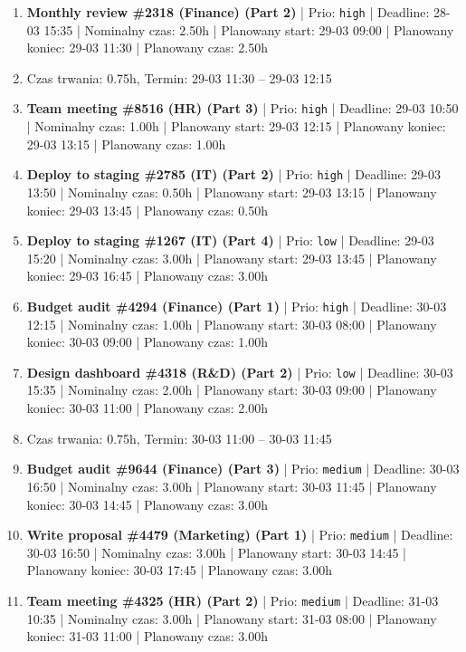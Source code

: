 {\begin{enumerate}
  \item [\textbf{14618}] \textbf{Monthly review \#2318 (Finance) (Part 2)} | Prio: \texttt{high} | Deadline: 28-03 15:35 | Nominalny czas: 2.50h | Planowany start: 29-03 09:00 | Planowany koniec: 29-03 11:30 | Planowany czas: 2.50h
  \item [\textbf{PRZERWA}] Czas trwania: 0.75h, Termin: 29-03 11:30 -- 29-03 12:15
  \item [\textbf{14624}] \textbf{Team meeting \#8516 (HR) (Part 3)} | Prio: \texttt{high} | Deadline: 29-03 10:50 | Nominalny czas: 1.00h | Planowany start: 29-03 12:15 | Planowany koniec: 29-03 13:15 | Planowany czas: 1.00h
  \item [\textbf{14623}] \textbf{Deploy to staging \#2785 (IT) (Part 2)} | Prio: \texttt{high} | Deadline: 29-03 13:50 | Nominalny czas: 0.50h | Planowany start: 29-03 13:15 | Planowany koniec: 29-03 13:45 | Planowany czas: 0.50h
  \item [\textbf{14686}] \textbf{Deploy to staging \#1267 (IT) (Part 4)} | Prio: \texttt{low} | Deadline: 29-03 15:20 | Nominalny czas: 3.00h | Planowany start: 29-03 13:45 | Planowany koniec: 29-03 16:45 | Planowany czas: 3.00h
  \item [\textbf{14619}] \textbf{Budget audit \#4294 (Finance) (Part 1)} | Prio: \texttt{high} | Deadline: 30-03 12:15 | Nominalny czas: 1.00h | Planowany start: 30-03 08:00 | Planowany koniec: 30-03 09:00 | Planowany czas: 1.00h
  \item [\textbf{14691}] \textbf{Design dashboard \#4318 (R\&D) (Part 2)} | Prio: \texttt{low} | Deadline: 30-03 15:35 | Nominalny czas: 2.00h | Planowany start: 30-03 09:00 | Planowany koniec: 30-03 11:00 | Planowany czas: 2.00h
  \item [\textbf{PRZERWA}] Czas trwania: 0.75h, Termin: 30-03 11:00 -- 30-03 11:45
  \item [\textbf{14659}] \textbf{Budget audit \#9644 (Finance) (Part 3)} | Prio: \texttt{medium} | Deadline: 30-03 16:50 | Nominalny czas: 3.00h | Planowany start: 30-03 11:45 | Planowany koniec: 30-03 14:45 | Planowany czas: 3.00h
  \item [\textbf{14660}] \textbf{Write proposal \#4479 (Marketing) (Part 1)} | Prio: \texttt{medium} | Deadline: 30-03 16:50 | Nominalny czas: 3.00h | Planowany start: 30-03 14:45 | Planowany koniec: 30-03 17:45 | Planowany czas: 3.00h
  \item [\textbf{14641}] \textbf{Team meeting \#4325 (HR) (Part 2)} | Prio: \texttt{medium} | Deadline: 31-03 10:35 | Nominalny czas: 3.00h | Planowany start: 31-03 08:00 | Planowany koniec: 31-03 11:00 | Planowany czas: 3.00h

\end{enumerate}}
